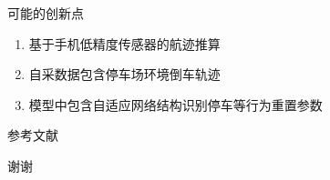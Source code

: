 \documentclass{beamer} %
\begin{document}
\begin{frame}{可能的创新点}
    \begin{enumerate}
        \item 基于手机低精度传感器的航迹推算
        \item 自采数据包含停车场环境倒车轨迹
        \item 模型中包含自适应网络结构识别停车等行为重置参数
    \end{enumerate}
\end{frame}


\begin{frame}[allowframebreaks]{参考文献} %
	\printbibliography[heading=references]
\end{frame}


\begin{frame}
    \begin{center}
        {\Huge 谢谢}
    \end{center}
\end{frame}
\end{document}
